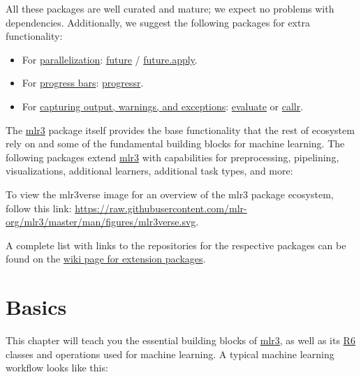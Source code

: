 \documentclass[
]{scrbook}
\providecommand{\tightlist}{%
  \setlength{\itemsep}{0pt}\setlength{\parskip}{0pt}}
\begin{document}
All these packages are well curated and mature; we expect no problems with dependencies.
Additionally, we suggest the following packages for extra functionality:

\begin{itemize}
\tightlist
\item
  For \protect\hyperlink{parallelization}{parallelization}: \href{https://cran.r-project.org/package=future}{future} / \href{https://cran.r-project.org/package=future.apply}{future.apply}.
\item
  For \protect\hyperlink{progress-bars}{progress bars}: \href{https://cran.r-project.org/package=progressr}{progressr}.
\item
  For \protect\hyperlink{error-handling}{capturing output, warnings, and exceptions}: \href{https://cran.r-project.org/package=evaluate}{evaluate} or \href{https://cran.r-project.org/package=callr}{callr}.
\end{itemize}

The \href{https://mlr3.mlr-org.com}{mlr3} package itself provides the base functionality that the rest of ecosystem rely on and some of the fundamental building blocks for machine learning.
The following packages extend \href{https://mlr3.mlr-org.com}{mlr3} with capabilities for preprocessing, pipelining, visualizations, additional learners, additional task types, and more:

To view the mlr3verse image for an overview of the mlr3 package ecosystem, follow this link: \url{https://raw.githubusercontent.com/mlr-org/mlr3/master/man/figures/mlr3verse.svg}.

A complete list with links to the repositories for the respective packages can be found on the \href{https://github.com/mlr-org/mlr3/wiki/Extension-Packages}{wiki page for extension packages}.

\hypertarget{basics}{%
\chapter{Basics}\label{basics}}

This chapter will teach you the essential building blocks of \href{https://mlr3.mlr-org.com}{mlr3}, as well as its \href{https://cran.r-project.org/package=R6}{R6} classes and operations used for machine learning.
A typical machine learning workflow looks like this:
\end{document}
